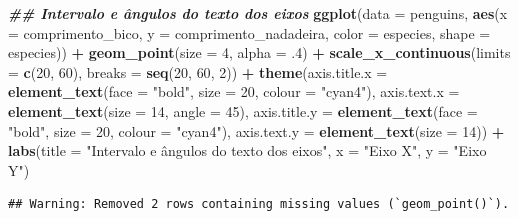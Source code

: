 \documentclass[
]{article}
\newenvironment{Shaded}{\begin{snugshade}}{\end{snugshade}}
\newcommand{\AttributeTok}[1]{\textcolor[rgb]{0.13,0.29,0.53}{#1}}
\newcommand{\DecValTok}[1]{\textcolor[rgb]{0.00,0.00,0.81}{#1}}
\newcommand{\DocumentationTok}[1]{\textcolor[rgb]{0.56,0.35,0.01}{\textbf{\textit{#1}}}}
\newcommand{\FunctionTok}[1]{\textcolor[rgb]{0.13,0.29,0.53}{\textbf{#1}}}
\newcommand{\NormalTok}[1]{#1}
\newcommand{\SpecialCharTok}[1]{\textcolor[rgb]{0.81,0.36,0.00}{\textbf{#1}}}
\newcommand{\StringTok}[1]{\textcolor[rgb]{0.31,0.60,0.02}{#1}}
\begin{document}
\begin{Shaded}
\begin{Highlighting}[]
\DocumentationTok{\#\# Intervalo e ângulos do texto dos eixos}
\FunctionTok{ggplot}\NormalTok{(}\AttributeTok{data =}\NormalTok{ penguins, }
       \FunctionTok{aes}\NormalTok{(}\AttributeTok{x =}\NormalTok{ comprimento\_bico, }\AttributeTok{y =}\NormalTok{ comprimento\_nadadeira,}
           \AttributeTok{color =}\NormalTok{ especies, }\AttributeTok{shape =}\NormalTok{ especies)) }\SpecialCharTok{+}
    \FunctionTok{geom\_point}\NormalTok{(}\AttributeTok{size =} \DecValTok{4}\NormalTok{, }\AttributeTok{alpha =}\NormalTok{ .}\DecValTok{4}\NormalTok{) }\SpecialCharTok{+}
    \FunctionTok{scale\_x\_continuous}\NormalTok{(}\AttributeTok{limits =} \FunctionTok{c}\NormalTok{(}\DecValTok{20}\NormalTok{, }\DecValTok{60}\NormalTok{), }\AttributeTok{breaks =} \FunctionTok{seq}\NormalTok{(}\DecValTok{20}\NormalTok{, }\DecValTok{60}\NormalTok{, }\DecValTok{2}\NormalTok{)) }\SpecialCharTok{+}
    \FunctionTok{theme}\NormalTok{(}\AttributeTok{axis.title.x =} \FunctionTok{element\_text}\NormalTok{(}\AttributeTok{face =} \StringTok{"bold"}\NormalTok{, }\AttributeTok{size =} \DecValTok{20}\NormalTok{, }\AttributeTok{colour =} \StringTok{"cyan4"}\NormalTok{),}
          \AttributeTok{axis.text.x =} \FunctionTok{element\_text}\NormalTok{(}\AttributeTok{size =} \DecValTok{14}\NormalTok{, }\AttributeTok{angle =} \DecValTok{45}\NormalTok{),}
          \AttributeTok{axis.title.y =} \FunctionTok{element\_text}\NormalTok{(}\AttributeTok{face =} \StringTok{"bold"}\NormalTok{, }\AttributeTok{size =} \DecValTok{20}\NormalTok{, }\AttributeTok{colour =} \StringTok{"cyan4"}\NormalTok{),}
          \AttributeTok{axis.text.y =} \FunctionTok{element\_text}\NormalTok{(}\AttributeTok{size =} \DecValTok{14}\NormalTok{)) }\SpecialCharTok{+}
    \FunctionTok{labs}\NormalTok{(}\AttributeTok{title =} \StringTok{"Intervalo e ângulos do texto dos eixos"}\NormalTok{, }\AttributeTok{x =} \StringTok{"Eixo X"}\NormalTok{, }\AttributeTok{y =} \StringTok{"Eixo Y"}\NormalTok{)}
\end{Highlighting}
\end{Shaded}

\begin{verbatim}
## Warning: Removed 2 rows containing missing values (`geom_point()`).
\end{verbatim}
\end{document}
